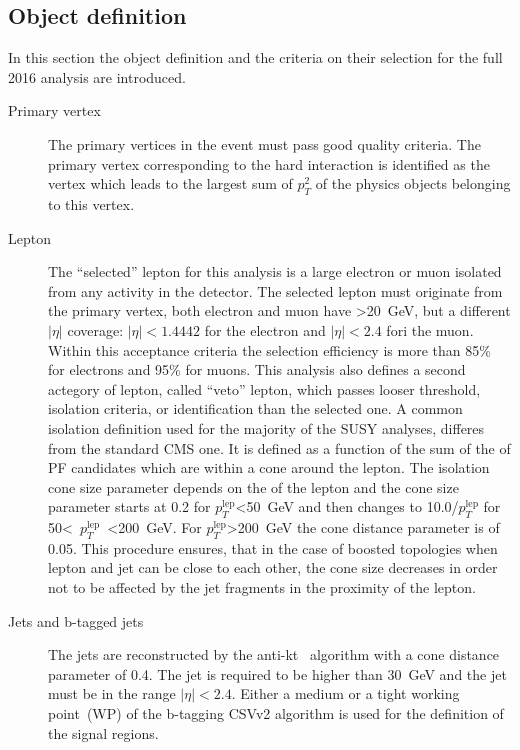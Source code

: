 
\subsection{Object definition~\label{sec:objects}}


In this section the object definition and the criteria on their selection for the full 2016 analysis are introduced.

\begin{description}
\item[Primary vertex]
The primary vertices in the event must pass good quality criteria. The primary vertex corresponding to the hard interaction is identified as the vertex which leads to the largest sum of $p_{T}^{2}$ of the physics objects belonging to this vertex.

\item[Lepton]
The ``selected'' lepton for this analysis is a large \pt electron or muon isolated from any activity in the detector. The selected lepton must originate from the primary vertex, both electron and muon have \pt>20~GeV, but a different $|\eta|$ coverage: $|\eta|<1.4442$ for the electron and $|\eta|<2.4$ fori the muon. Within this acceptance criteria the selection efficiency is more than 85\% for electrons and 95\% for muons. This analysis also defines a second actegory of lepton, called ``veto'' lepton, which passes looser  \pt threshold, isolation criteria, or identification than the selected one. A common isolation definition used for the majority of the SUSY analyses, differes from the standard CMS one. It is defined as a function of the sum of the \pt of PF candidates which are within a cone around the lepton. The isolation cone size parameter depends on the \pt of the lepton and the cone size parameter  starts at 0.2 for $p_{T}^{\mathrm{lep}}$<50~GeV and then changes to 10.0/$p_{T}^{\mathrm{lep}}$ for  50<~$p_{T}^{\mathrm{lep}}$~<200~GeV. For $p_{T}^{\mathrm{lep}}$>200~GeV the cone distance parameter is of 0.05. This procedure ensures, that in the case of boosted topologies when lepton and jet can be close to each other, the cone size decreases in order not to be affected by the jet fragments in the proximity of the lepton.   

\item[Jets and b-tagged jets]
The jets are reconstructed by the anti-kt~\cite{Cacciari:2008gp} algorithm with a cone distance parameter of 0.4. The jet \pt is required to be higher than 30~GeV and the jet must be in the range $|\eta|<2.4$. Either a medium or a tight working point~(WP) of the b-tagging CSVv2 algorithm is used for the definition of the signal regions.  


\end{description}
